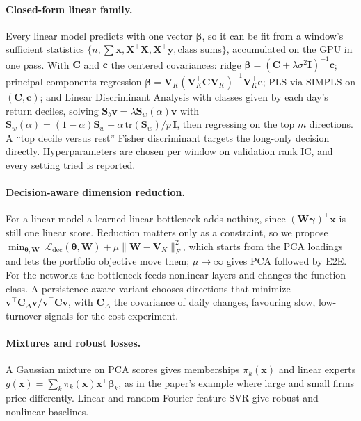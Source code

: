 \documentclass[10pt,a4paper]{article}
\begin{document}
\paragraph{Closed-form linear family.} Every linear model predicts with one vector $\bm\beta$, so it can be fit
from a window's sufficient statistics $\{n,\sum\bm x,\bm X^\top\bm X,\bm X^\top\bm y,\text{class sums}\}$,
accumulated on the GPU in one pass. With $\bm C$ and $\bm c$ the centered covariances:
ridge $\bm\beta=(\bm C+\lambda\bar\sigma^2\bm I)^{-1}\bm c$; principal components regression
$\bm\beta=\bm V_K(\bm V_K^\top\bm C\bm V_K)^{-1}\bm V_K^\top\bm c$; PLS via SIMPLS on $(\bm C,\bm c)$; and Linear
Discriminant Analysis with classes given by each day's return deciles, solving $\bm S_b\bm v=\lambda\bm S_w(\alpha)\bm v$
with $\bm S_w(\alpha)=(1-\alpha)\bm S_w+\alpha\,\mathrm{tr}(\bm S_w)/p\,\bm I$, then regressing on the top $m$
directions. A ``top decile versus rest'' Fisher discriminant targets the long-only decision directly.
Hyperparameters are chosen per window on validation rank IC, and every setting tried is reported.

\paragraph{Decision-aware dimension reduction.} For a linear model a learned linear bottleneck adds nothing,
since $(\bm W\bm\gamma)^\top\bm x$ is still one linear score. Reduction matters only as a constraint, so we
propose
$\min_{\bm\theta,\bm W}\ \mathcal L_{\mathrm{dec}}(\bm\theta,\bm W)+\mu\lVert\bm W-\bm V_K\rVert_F^2$, which
starts from the PCA loadings and lets the portfolio objective move them; $\mu\to\infty$ gives PCA followed by E2E.
For the networks the bottleneck feeds nonlinear layers and changes the function class. A persistence-aware
variant chooses directions that minimize $\bm v^\top\bm C_\Delta\bm v/\bm v^\top\bm C\bm v$, with $\bm C_\Delta$ the
covariance of daily changes, favouring slow, low-turnover signals for the cost experiment.

\paragraph{Mixtures and robust losses.} A Gaussian mixture on PCA scores gives memberships $\pi_k(\bm x)$ and linear
experts $g(\bm x)=\sum_k\pi_k(\bm x)\bm x^\top\bm\beta_k$, as in the paper's example where large and small firms
price differently. Linear and random-Fourier-feature SVR give robust and nonlinear baselines.
\end{document}
